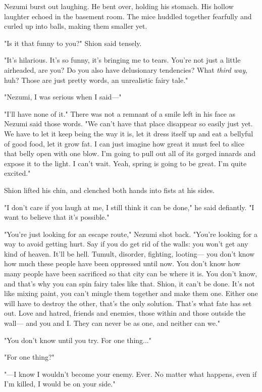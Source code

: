 Nezumi burst out laughing. He bent over, holding his stomach. His hollow
laughter echoed in the basement room. The mice huddled together
fearfully and curled up into balls, making them smaller yet.

"Is it that funny to you?" Shion said tensely.

"It's hilarious. It's so funny, it's bringing me to tears. You're not
just a little airheaded, are you? Do you also have delusionary
tendencies? What \emph{third way}, huh? Those are just pretty words, an
unrealistic fairy tale."

"Nezumi, I was serious when I said---"

"I'll have none of it." There was not a remnant of a smile left in his
face as Nezumi said those words. "We can't have that place disappear so
easily just yet. We have to let it keep being the way it is, let it
dress itself up and eat a bellyful of good food, let it grow fat. I can
just imagine how great it must feel to slice that belly open with one
blow. I'm going to pull out all of its gorged innards and expose it to
the light. I can't wait. Yeah, spring is going to be great. I'm quite
excited."

Shion lifted his chin, and clenched both hands into fists at his sides.

"I don't care if you laugh at me, I still think it can be done," he said
defiantly. "I want to believe that it's possible."

"You're just looking for an escape route," Nezumi shot back. "You're
looking for a way to avoid getting hurt. Say if you do get rid of the
walls: you won't get any kind of heaven. It'll be hell. Tumult,
disorder, fighting, looting--- you don't know how much these people have
been oppressed until now. You don't know how many people have been
sacrificed so that city can be where it is. You don't know, and that's
why you can spin fairy tales like that. Shion, it can't be done. It's
not like mixing paint, you can't mingle them together and make them one.
Either one will have to destroy the other, that's the only solution.
That's what fate has set out. Love and hatred, friends and enemies,
those within and those outside the wall--- and you and I. They can never
be as one, and neither can we."

\mybreak

"You don't know until you try. For one thing..."

"For one thing?"

"---I know I wouldn't become your enemy. Ever. No matter what happens,
even if I'm killed, I would be on your side."

